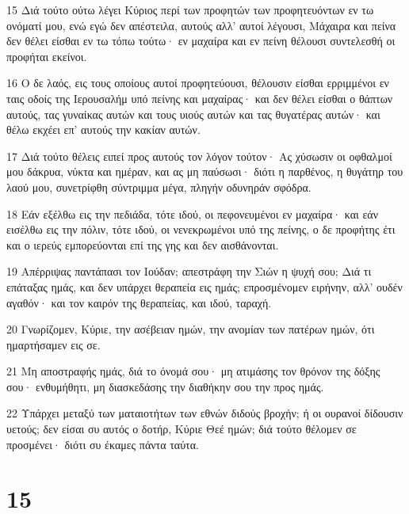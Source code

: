 \par 15 Διά τούτο ούτω λέγει Κύριος περί των προφητών των προφητευόντων εν τω ονόματί μου, ενώ εγώ δεν απέστειλα, αυτούς αλλ' αυτοί λέγουσι, Μάχαιρα και πείνα δεν θέλει είσθαι εν τω τόπω τούτω· εν μαχαίρα και εν πείνη θέλουσι συντελεσθή οι προφήται εκείνοι.
\par 16 Ο δε λαός, εις τους οποίους αυτοί προφητεύουσι, θέλουσιν είσθαι ερριμμένοι εν ταις οδοίς της Ιερουσαλήμ υπό πείνης και μαχαίρας· και δεν θέλει είσθαι ο θάπτων αυτούς, τας γυναίκας αυτών και τους υιούς αυτών και τας θυγατέρας αυτών· και θέλω εκχέει επ' αυτούς την κακίαν αυτών.
\par 17 Διά τούτο θέλεις ειπεί προς αυτούς τον λόγον τούτον· Ας χύσωσιν οι οφθαλμοί μου δάκρυα, νύκτα και ημέραν, και ας μη παύσωσι· διότι η παρθένος, η θυγάτηρ του λαού μου, συνετρίφθη σύντριμμα μέγα, πληγήν οδυνηράν σφόδρα.
\par 18 Εάν εξέλθω εις την πεδιάδα, τότε ιδού, οι πεφονευμένοι εν μαχαίρα· και εάν εισέλθω εις την πόλιν, τότε ιδού, οι νενεκρωμένοι υπό της πείνης, ο δε προφήτης έτι και ο ιερεύς εμπορεύονται επί της γης και δεν αισθάνονται.
\par 19 Απέρριψας παντάπασι τον Ιούδαν; απεστράφη την Σιών η ψυχή σου; Διά τι επάταξας ημάς, και δεν υπάρχει θεραπεία εις ημάς; επροσμένομεν ειρήνην, αλλ' ουδέν αγαθόν· και τον καιρόν της θεραπείας, και ιδού, ταραχή.
\par 20 Γνωρίζομεν, Κύριε, την ασέβειαν ημών, την ανομίαν των πατέρων ημών, ότι ημαρτήσαμεν εις σε.
\par 21 Μη αποστραφής ημάς, διά το όνομά σου· μη ατιμάσης τον θρόνον της δόξης σου· ενθυμήθητι, μη διασκεδάσης την διαθήκην σου την προς ημάς.
\par 22 Υπάρχει μεταξύ των ματαιοτήτων των εθνών διδούς βροχήν; ή οι ουρανοί δίδουσιν υετούς; δεν είσαι συ αυτός ο δοτήρ, Κύριε Θεέ ημών; διά τούτο θέλομεν σε προσμένει· διότι συ έκαμες πάντα ταύτα.

\chapter{15}

